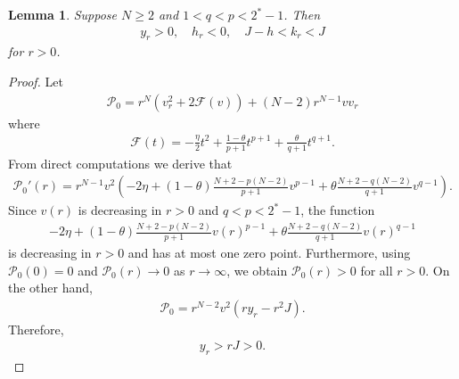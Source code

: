 \documentclass[10pt,a4paper]{amsart}
\newtheorem{lemma}{Lemma}
\newcommand{\p}{\mathcal{P}}
\begin{document}
	\begin{lemma} \label{lemestimate}
		Suppose $N \ge 2$ and $1 < q < p < 2^* -1$. Then
		\begin{align} \label{usefulestimate1}
			y_r > 0, \quad h_r < 0, \quad J - h < k_r < J
		\end{align}
		for $r > 0$.
	\end{lemma}

	\begin{proof}
		Let
		\begin{align*}
			\p_0 = r^N\left(v_r^2 + 2\mathcal{F}(v)\right) + (N-2)r^{N-1}vv_r
		\end{align*}
		where
		\begin{align*}
			\mathcal{F}(t) = -\frac{\eta}{2}t^2 + \frac{1-\theta}{p+1}t^{p+1} + \frac{\theta}{q+1}t^{q+1}.
		\end{align*}
		From direct computations we derive that
		\begin{align*}
			\p_0'(r) = r^{N-1}v^2\left(-2\eta + (1-\theta)\frac{N+2-p(N-2)}{p+1}v^{p-1} + \theta\frac{N+2-q(N-2)}{q+1}v^{q-1}\right).
		\end{align*}
		Since $v(r)$ is decreasing in $r > 0$ and $q < p < 2^* -1$, the function
		\begin{align*}
			-2\eta + (1-\theta)\frac{N+2-p(N-2)}{p+1}v(r)^{p-1} + \theta\frac{N+2-q(N-2)}{q+1}v(r)^{q-1}
		\end{align*}
		is decreasing in $r > 0$ and has at most one zero point. Furthermore, using $\p_0(0) = 0$ and $\p_0(r) \to 0$ as $r \to \infty$, we obtain $\p_0(r) > 0$ for all $r > 0$. On the other hand,
		\begin{align*}
			\p_0 = r^{N-2}v^2\left(ry_r - r^2J\right).
		\end{align*}
		Therefore,
		\begin{align*}
			y_r > rJ > 0.
		\end{align*}


\end{proof}
\end{document}
